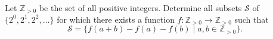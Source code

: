 Let $\mathbb{Z}_{>0}$ be the set of all positive integers. Determine all subsets $\mathcal{S}$ of $\{2^0, 2^1, 2^2, \ldots\}$ for which there exists a function $f \colon \mathbb{Z}_{>0} \to \mathbb{Z}_{>0}$ such that
\[
\mathcal{S} = \{ f(a + b) - f(a) - f(b) \mid a, b \in \mathbb{Z}_{>0} \}.
\]
